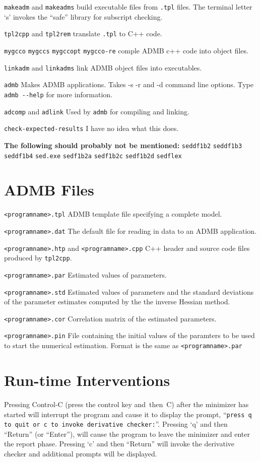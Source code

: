 \documentclass[a4paper,10pt,notumble]{leaflet}
\begin{document}
\verb+makeadm+ and \verb+makeadms+ build executable files from 
\verb+.tpl+ files. The terminal letter `s' invokes the ``safe''
library for subscript checking.

\verb+tpl2cpp+ and \verb+tpl2rem+ translate \verb+.tpl+ to C++ code.

\verb+mygcco+ \verb+mygccs+ \verb+mygccopt+ \verb+mygcco-re+ comple
ADMB c++ code into object files.

\verb+linkadm+ and \verb+linkadms+ link ADMB object files into
executables.

\verb+admb+ Makes ADMB applications. Takes -s -r and -d command line
options. Type \verb+admb --help+ for more information.

\verb+adcomp+ and \verb+adlink+ Used by \verb+admb+ for compiling and
linking.

\verb+check-expected-results+ I have no idea what this does.

{\bf The following should probably not be mentioned:}
\verb+seddf1b2+
\verb+seddf1b3+
\verb+seddf1b4+
\verb+sed.exe+
\verb+sedf1b2a+
\verb+sedf1b2c+
\verb+sedf1b2d+
\verb+sedflex+

\section {ADMB Files}

\verb+<programname>.tpl+ ADMB template file specifying a complete
model.

\verb+<programname>.dat+ The default file for reading in data to an
ADMB application.

\verb+<programname>.htp+ and \verb+<programname>.cpp+ C++ header and
source code files produced by \verb+tpl2cpp+.

\verb+<programname>.par+ Estimated values of parameters.

\verb+<programname>.std+ Estimated values of parameters and the
standard deviations of the parameter estimates computed by the the inverse
Hessian method.

\verb+<programname>.cor+ Correlation matrix of the estimated
parameters.

\verb+<programname>.pin+ File containing the initial values of the
paramters to be used to start the numerical estimation. Format is the
same as \verb+<programname>.par+ 

\section{Run-time Interventions}
Pressing Control-C (press the control key and~then~C) after the
minimizer has started will interrupt the program and cause it to
display the prompt, 
``\verb|press q to quit or c to invoke derivative checker:|''.
Pressing `q' and then ``Return'' (or ``Enter''), will cause the
program to leave the minimizer and enter the report phase. Pressing
`c' and then ``Return'' will invoke the derivative checker and
additional prompts will be displayed.
\end{document}
